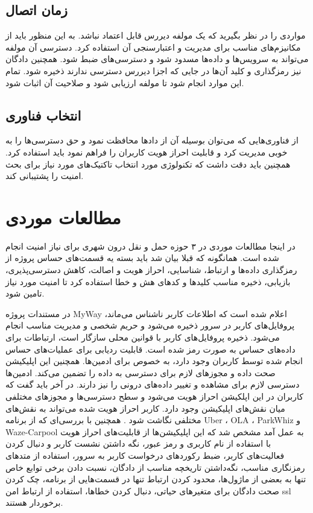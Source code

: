 \subsection{زمان اتصال}
مواردی را در نظر بگیرید که یک مولفه دیررس قابل اعتماد نباشد. 
به این منظور باید از مکانیزم‌های مناسب برای مدیریت و اعتبارسنجی آن‌ استفاده کرد. دسترسی آن مولفه می‌تواند به سرویس‌ها و داده‌ها مسدود شود و دسترسی‌های ضبط شود. همچنین دادگان نیز رمزگذاری و کلید آن‌ها در جایی که اجزا دیررس دسترسی ندارند ذخیره شود. تمام این موارد انجام شود تا مولفه ارزیابی شود و صلاحیت آن اثبات شود.

\subsection{انتخاب فناوری}
از فناوری‌هایی که می‌توان بوسیله آن از داد‌ها محافظت نمود و حق دسترسی‌ها را به خوبی مدیریت کرد و قابلیت احراز هویت کاربران را فراهم نمود باید استفاده کرد.
همچنین باید دقت داشت که تکنولوژی مورد انتخاب تاکتیک‌های مورد نیاز برای بحث امنیت را پشتیبانی کند.


\section{مطالعات موردی}
در اینجا مطالعات موردی در ۳ حوزه حمل و نقل درون شهری برای نیاز امنیت انجام شده است.
همانگونه که قبلا بیان شد باید بسته یه قسمت‌های حساس پروژه از رمزگذاری داد‌ه‌ها و ارتباط، شناسایی، احراز هویت و اصالت، کاهش دسترسی‌پذیری، بازیابی، ذخیره مناسب کلید‌ها و کدهای هش و خطا استفاده کرد تا امنیت مورد نیاز تامین شود.
 
در مستندات پروژه MyWay اعلام شده است که اطلاعات کاربر ناشناس می‌ماند، پروفایل‌های کاربر در سرور ذخیره می‌شود و حریم شخصی و مدیریت مناسب انجام می‌شود. ذخیره پروفایل‌های کاربر با قوانین محلی سازگار است، ارتباطات برای داده‌های حساس به صورت رمز شده است.  قابلیت ردیابی برای عملیات‌های حساس انجام شده توسط کاربران وجود دارد، به خصوص برای ادمین‌ها. همچنین این اپلیکیشن صحت داده و مجوز‌های لازم برای دسترسی به داده را تضمین می‌کند. ادمین‌ها دسترسی لازم برای مشاهده و تغییر داده‌های درونی را نیز دارند.
در آخر باید گفت که کاربران در این اپلکیشن احراز هویت می‌شود و سطح دسترسی‌ها و مجوزهای مختلفی میان نقش‌های اپلیکیشن وجود دارد. کاربر احراز هویت شده می‌تواند به نقش‌های مختلفی نگاشت شود \cite{myway_req}.
همچنین با بررسی‌ای که از برنامه Uber ، OLA ، ParkWhiz و Waze-Carpool به عمل آمد مشخص شد که این اپلیکیشن‌ها از قابلیت‌های احراز هویت با استفاده از نام کاربری و رمز عبور، نگه داشتن نشست کاربر و دنبال کردن فعالیت‌های کاربر، ضبط رکوردهای درخواست کاربر به سرور، استفاده از متد‌های رمزنگاری مناسب، نگه‌داشتن تاریخچه مناسب از دادگان، نسبت دادن برخی توابع خاص تنها به بعضی از ماژول‌ها، محدود کردن ارتباط تنها در قسمت‌هایی از برنامه،‌ چک کردن صحت دادگان برای متغیرهای حیاتی، دنبال کردن خطاها، استفاده از ارتباط امن ssl  برخوردار هستند.


